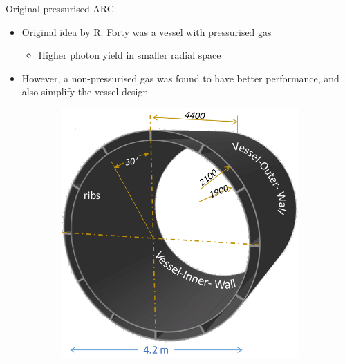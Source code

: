 \documentclass{beamer}
\begin{document}
\begin{frame}{Original pressurised ARC}
  \begin{itemize}
    \setlength\itemsep{0.5em}
    \item{Original idea by R. Forty was a vessel with pressurised gas}
    \begin{itemize}
      \item{Higher photon yield in smaller radial space}
    \end{itemize}
    \item{However, a non-pressurised gas was found to have better performance, and also simplify the vessel design}
  \end{itemize}
  \begin{figure}
    \centering
    \begin{subfigure}{0.35\textwidth}
      \includegraphics[width = 1.0\textwidth]{Plots/CarbonFiberVessel.png}
    \end{subfigure}%
    \hspace{0.7cm}
    \begin{subfigure}{0.35\textwidth}

\end{subfigure}
\end{figure}
\end{frame}
\end{document}

